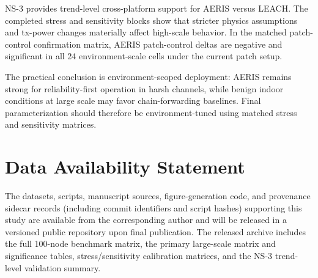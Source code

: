 ﻿\documentclass[sensors,article,submit,moreauthors,pdftex]{Definitions/mdpi}
\begin{document}
NS-3 provides trend-level cross-platform support for AERIS versus LEACH. The completed stress and sensitivity blocks show that stricter physics assumptions and tx-power changes materially affect high-scale behavior. In the matched patch-control confirmation matrix, AERIS patch-control deltas are negative and significant in all 24 environment-scale cells under the current patch setup.

The practical conclusion is environment-scoped deployment: AERIS remains strong for reliability-first operation in harsh channels, while benign indoor conditions at large scale may favor chain-forwarding baselines. Final parameterization should therefore be environment-tuned using matched stress and sensitivity matrices.

\section*{Data Availability Statement}
The datasets, scripts, manuscript sources, figure-generation code, and provenance sidecar records (including commit identifiers and script hashes) supporting this study are available from the corresponding author and will be released in a versioned public repository upon final publication. The released archive includes the full 100-node benchmark matrix, the primary large-scale matrix and significance tables, stress/sensitivity calibration matrices, and the NS-3 trend-level validation summary.


\end{document}
